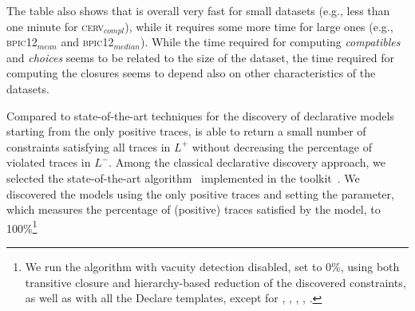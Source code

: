 The table also shows that \nd is overall very fast for small datasets (e.g., less than one minute for \textsc{cerv$_{compl}$}), while it requires some more time for large ones (e.g., \textsc{bpic12$_{mean}$} and \textsc{bpic12$_{median}$}). While the time required for computing \textit{compatibles} and \textit{choices} seems to be related to the size of the dataset, the time required for computing the closures seems to depend also on other characteristics of the datasets. 



Compared to state-of-the-art techniques for the discovery of declarative models starting from the only positive traces, \nd is able to return a small number of constraints satisfying all traces in $L^+$ without decreasing the percentage of violated traces in $L^-$.  
Among the classical declarative discovery approach, we selected the state-of-the-art \declareminer algorithm~\cite{2018a-Maggi} implemented in the \rum toolkit~\cite{2020-Alman}. We discovered the models using the only positive traces and setting the  parameter, which measures the percentage of (positive) traces satisfied by the \declare model, to 100\%\footnote{We run the \declareminer algorithm with vacuity detection disabled,  set to 0\%, using both transitive closure and hierarchy-based reduction of the discovered constraints, as well as with all the Declare templates, except for , , , , .}

